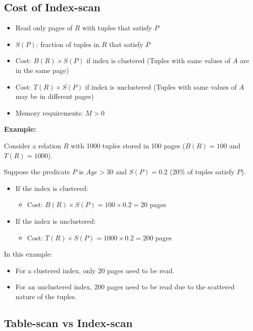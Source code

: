 \documentclass[12pt,a4paper]{article}
\begin{document}
\subsection*{Cost of Index-scan}

\begin{itemize}
    \item Read only pages of $R$ with tuples that satisfy $P$
    \item $S(P)$: fraction of tuples in $R$ that satisfy $P$
    \item Cost: $B(R) \times S(P)$ if index is clustered (Tuples with same values of $A$ are in the same page)
    \item Cost: $T(R) \times S(P)$ if index is unclustered (Tuples with same values of $A$ may be in different pages)
    \item Memory requirements: $M > 0$
\end{itemize}

\textbf{Example:}

Consider a relation $R$ with 1000 tuples stored in 100 pages ($B(R) = 100$ and $T(R) = 1000$).

Suppose the predicate $P$ is $Age > 30$ and $S(P) = 0.2$ (20\% of tuples satisfy $P$).

\begin{itemize}
    \item If the index is clustered:
    \begin{itemize}
        \item Cost: $B(R) \times S(P) = 100 \times 0.2 = 20$ pages
    \end{itemize}
    \item If the index is unclustered:
    \begin{itemize}
        \item Cost: $T(R) \times S(P) = 1000 \times 0.2 = 200$ pages
    \end{itemize}
\end{itemize}

In this example:

\begin{itemize}
    \item For a clustered index, only 20 pages need to be read.
    \item For an unclustered index, 200 pages need to be read due to the scattered nature of the tuples.
\end{itemize}

\subsection*{Table-scan vs Index-scan}
\end{document}
